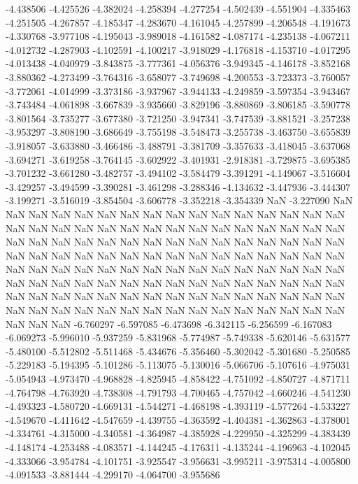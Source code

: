 -4.438506
-4.425526
-4.382024
-4.258394
-4.277254
-4.502439
-4.551904
-4.335463
-4.251505
-4.267857
-4.185347
-4.283670
-4.161045
-4.257899
-4.206548
-4.191673
-4.330768
-3.977108
-4.195043
-3.989018
-4.161582
-4.087174
-4.235138
-4.067211
-4.012732
-4.287903
-4.102591
-4.100217
-3.918029
-4.176818
-4.153710
-4.017295
-4.013438
-4.040979
-3.843875
-3.777361
-4.056376
-3.949345
-4.146178
-3.852168
-3.880362
-4.273499
-3.764316
-3.658077
-3.749698
-4.200553
-3.723373
-3.760057
-3.772061
-4.014999
-3.373186
-3.937967
-3.944133
-4.249859
-3.597354
-3.943467
-3.743484
-4.061898
-3.667839
-3.935660
-3.829196
-3.880869
-3.806185
-3.590778
-3.801564
-3.735277
-3.677380
-3.721250
-3.947341
-3.747539
-3.881521
-3.257238
-3.953297
-3.808190
-3.686649
-3.755198
-3.548473
-3.255738
-3.463750
-3.655839
-3.918057
-3.633880
-3.466486
-3.488791
-3.381709
-3.357633
-3.418045
-3.637068
-3.694271
-3.619258
-3.764145
-3.602922
-3.401931
-2.918381
-3.729875
-3.695385
-3.701232
-3.661280
-3.482757
-3.494102
-3.584479
-3.391291
-4.149067
-3.516604
-3.429257
-3.494599
-3.390281
-3.461298
-3.288346
-4.134632
-3.447936
-3.444307
-3.199271
-3.516019
-3.854504
-3.606778
-3.352218
-3.354339
NaN
-3.227090
NaN
NaN
NaN
NaN
NaN
NaN
NaN
NaN
NaN
NaN
NaN
NaN
NaN
NaN
NaN
NaN
NaN
NaN
NaN
NaN
NaN
NaN
NaN
NaN
NaN
NaN
NaN
NaN
NaN
NaN
NaN
NaN
NaN
NaN
NaN
NaN
NaN
NaN
NaN
NaN
NaN
NaN
NaN
NaN
NaN
NaN
NaN
NaN
NaN
NaN
NaN
NaN
NaN
NaN
NaN
NaN
NaN
NaN
NaN
NaN
NaN
NaN
NaN
NaN
NaN
NaN
NaN
NaN
NaN
NaN
NaN
NaN
NaN
NaN
NaN
NaN
NaN
NaN
NaN
NaN
NaN
NaN
NaN
NaN
NaN
NaN
NaN
NaN
NaN
NaN
NaN
NaN
NaN
NaN
NaN
NaN
NaN
NaN
NaN
NaN
NaN
NaN
NaN
NaN
NaN
NaN
NaN
NaN
NaN
NaN
NaN
NaN
NaN
NaN
NaN
NaN
NaN
NaN
NaN
NaN
NaN
NaN
NaN
NaN
-6.760297
-6.597085
-6.473698
-6.342115
-6.256599
-6.167083
-6.069273
-5.996010
-5.937259
-5.831968
-5.774987
-5.749338
-5.620146
-5.631577
-5.480100
-5.512802
-5.511468
-5.434676
-5.356460
-5.302042
-5.301680
-5.250585
-5.229183
-5.194395
-5.101286
-5.113075
-5.130016
-5.066706
-5.107616
-4.975031
-5.054943
-4.973470
-4.968828
-4.825945
-4.858422
-4.751092
-4.850727
-4.871711
-4.764798
-4.763920
-4.738308
-4.791793
-4.700465
-4.757042
-4.660246
-4.541230
-4.493323
-4.580720
-4.669131
-4.544271
-4.468198
-4.393119
-4.577264
-4.533227
-4.549670
-4.411642
-4.547659
-4.439755
-4.363592
-4.404381
-4.362863
-4.378001
-4.334761
-4.315000
-4.340581
-4.364987
-4.385928
-4.229950
-4.325299
-4.383439
-4.148174
-4.253488
-4.083571
-4.144245
-4.176311
-4.135244
-4.196963
-4.102045
-4.333066
-3.954784
-4.101751
-3.925547
-3.956631
-3.995211
-3.975314
-4.005800
-4.091533
-3.881444
-4.299170
-4.064700
-3.955686
